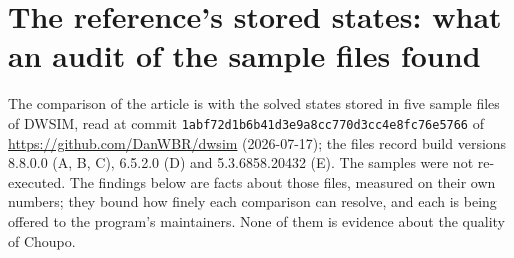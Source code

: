 \documentclass[11pt]{article}
\newcommand{\code}[1]{\nolinkurl{#1}}
\begin{document}
\section{The reference's stored states: what an audit of the sample files found}
\label{s:audit}

The comparison of the article is with the solved states stored in five
sample files of DWSIM, read at commit
\code{1abf72d1b6b41d3e9a8cc770d3cc4e8fc76e5766} of
\url{https://github.com/DanWBR/dwsim} (2026-07-17); the files record build
versions 8.8.0.0 (A, B, C), 6.5.2.0 (D) and 5.3.6858.20432 (E).  The
samples were not re-executed.  The findings below are facts about those
files, measured on their own numbers; they bound how finely each comparison
can resolve, and each is being offered to the program's maintainers.  None
of them is evidence about the quality of Choupo.
\end{document}
